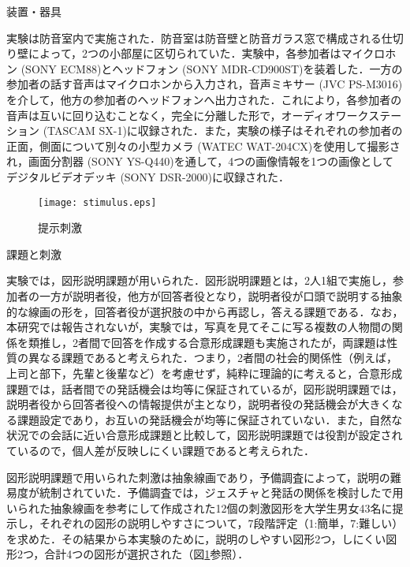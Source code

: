 \documentclass[japanese]{jnlp_1.3a}
\begin{document}
\vspace{10pt}
\noindent 装置・器具

実験は防音室内で実施された．防音室は防音壁と防音ガラス窓で構成される仕切り壁によって，2つの小部屋に区切られていた．実験中，各参加者はマイクロホン (SONY ECM88)とヘッドフォン (SONY MDR-CD900ST)を装着した．一方の参加者の話す音声はマイクロホンから入力され，音声ミキサー (JVC PS-M3016)を介して，他方の参加者のヘッドフォンへ出力された．これにより，各参加者の音声は互いに回り込むことなく，完全に分離した形で，オーディオワークステーション (TASCAM SX-1)に収録された．また，実験の様子はそれぞれの参加者の正面，側面について別々の小型カメラ (WATEC WAT-204CX)を使用して撮影され，画面分割器 (SONY YS-Q440)を通して，4つの画像情報を1つの画像としてデジタルビデオデッキ (SONY DSR-2000)に収録された．

\begin{figure}[t]
      \begin{center}
      \texttt{[image: stimulus.eps]}
      \caption{提示刺激}          
      
      \label{figures}
      \end{center}
\end{figure}

\vspace{10pt}
\noindent 課題と刺激

実験では，図形説明課題が用いられた．図形説明課題とは，2人1組で実施し，参加者の一方が説明者役，他方が回答者役となり，説明者役が口頭で説明する抽象的な線画の形を，回答者役が選択肢の中から再認し，答える課題である．なお，本研究では報告されないが，実験では，写真を見てそこに写る複数の人物間の関係を類推し，2者間で回答を作成する合意形成課題も実施されたが，両課題は性質の異なる課題であると考えられた．つまり，2者間の社会的関係性（例えば，上司と部下，先輩と後輩など）を考慮せず，純粋に理論的に考えると，合意形成課題では，話者間での発話機会は均等に保証されているが，図形説明課題では，説明者役から回答者役への情報提供が主となり，説明者役の発話機会が大きくなる課題設定であり，お互いの発話機会が均等に保証されていない．また，自然な状況での会話に近い合意形成課題と比較して，図形説明課題では役割が設定されているので，個人差が反映しにくい課題であると考えられた．

図形説明課題で用いられた刺激は抽象線画であり，予備調査によって，説明の難易度が統制されていた．予備調査では，ジェスチャと発話の関係を検討したで用いられた抽象線画を参考にして作成された12個の刺激図形を大学生男女43名に提示し，それぞれの図形の説明しやすさについて，7段階評定（1:簡単，7:難しい）を求めた．その結果から本実験のために，説明のしやすい図形2つ，しにくい図形2つ，合計4つの図形が選択された（図\ref{figures}参照）．
\end{document}
